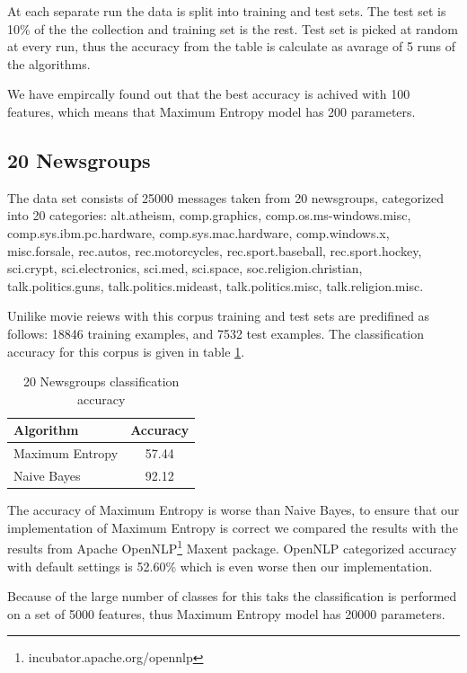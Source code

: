 \documentclass{report}
\begin{document}
At each separate run the data is split into training and test sets. The test set is 10\% of the the collection and training set is the rest. Test set is picked at random at every run, thus the accuracy from the table is calculate as avarage of 5 runs of the algorithms.

We have empircally found out that the best accuracy is achived with 100 features, which means that Maximum Entropy model has 200 parameters.

\subsection{20 Newsgroups}

The data set consists of 25000 messages taken from 20 newsgroups, categorized into 20 categories: alt.atheism, comp.graphics, comp.os.ms-windows.misc,     comp.sys.ibm.pc.hardware, comp.sys.mac.hardware, comp.windows.x, misc.forsale,  rec.autos, rec.motorcycles, rec.sport.baseball, rec.sport.hockey, sci.crypt, sci.electronics,     sci.med, sci.space, soc.religion.christian, talk.politics.guns, talk.politics.mideast,     talk.politics.misc, talk.religion.misc.

Unilike movie reiews with this corpus training and test sets are predifined as follows: 18846 training examples, and 7532 test examples. The classification accuracy for this corpus is given in table \ref{table:20nprecision}. 

\begin{table}[ht]
\centering
\begin{tabular}{ l c }
    \hline\hline
    Algorithm & Accuracy \\ [0.2ex]
    \hline
    Maximum Entropy &  57.44 \\
    Naive Bayes & 92.12  \\
    \hline
  \end{tabular}
\label{table:20nprecision}
\caption{20 Newsgroups classification accuracy}
\end{table}

The accuracy of Maximum Entropy is worse than Naive Bayes, to ensure that our implementation of Maximum Entropy is correct we compared the results with the results from Apache OpenNLP\footnote{incubator.apache.org/opennlp} Maxent package. OpenNLP categorized accuracy with default settings is 52.60\% which is even worse then our implementation.

Because of the large number of classes for this taks the classification is performed on a set of 5000 features, thus Maximum Entropy model has 20000 parameters.
\end{document}
